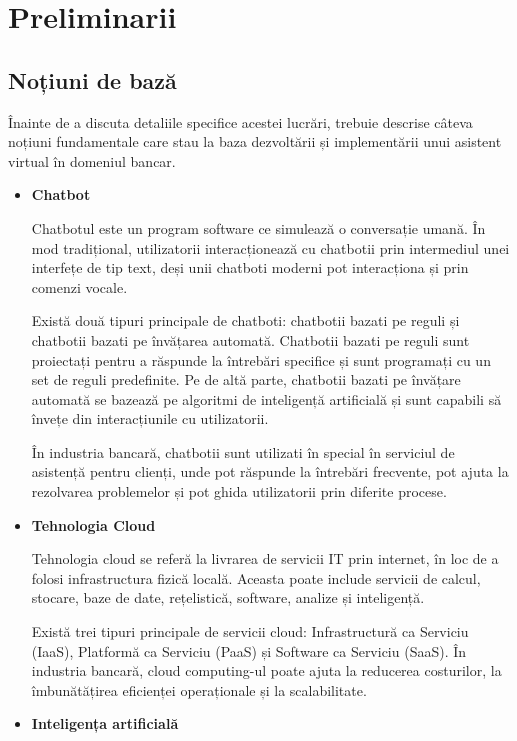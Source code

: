 \chapter{Preliminarii}

\section{Noțiuni de bază}

Înainte de a discuta detaliile specifice acestei lucrări, trebuie descrise câteva noțiuni fundamentale care stau la baza dezvoltării și implementării unui asistent virtual în domeniul bancar.

\begin{itemize}
    \item \textbf{Chatbot} 

Chatbotul este un program software ce simulează o conversație umană. În mod tradițional, utilizatorii interacționează cu chatbotii prin intermediul unei interfețe de tip text, deși unii chatboti moderni pot interacționa și prin comenzi vocale.

Există două tipuri principale de chatboti: chatbotii bazati pe reguli și chatbotii bazati pe învățarea automată. Chatbotii bazati pe reguli sunt proiectați pentru a răspunde la întrebări specifice și sunt programați cu un set de reguli predefinite. Pe de altă parte, chatbotii bazati pe învățare automată se bazează pe algoritmi de inteligență artificială și sunt capabili să învețe din interacțiunile cu utilizatorii.

În industria bancară, chatbotii sunt utilizati în special în serviciul de asistență pentru clienți, unde pot răspunde la întrebări frecvente, pot ajuta la rezolvarea problemelor și pot ghida utilizatorii prin diferite procese.

    \item \textbf{Tehnologia Cloud}

Tehnologia cloud se referă la livrarea de servicii IT prin internet, în loc de a folosi infrastructura fizică locală. Aceasta poate include servicii de calcul, stocare, baze de date, rețelistică, software, analize și inteligență.

Există trei tipuri principale de servicii cloud: Infrastructură ca Serviciu (IaaS), Platformă ca Serviciu (PaaS) și Software ca Serviciu (SaaS). În industria bancară, cloud computing-ul poate ajuta la reducerea costurilor, la îmbunătățirea eficienței operaționale și la scalabilitate.

    \item \textbf{Inteligența artificială} 


\end{itemize}
